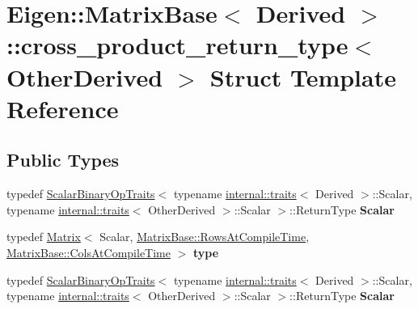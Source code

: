 \hypertarget{struct_eigen_1_1_matrix_base_1_1cross__product__return__type}{}\section{Eigen\+:\+:Matrix\+Base$<$ Derived $>$\+:\+:cross\+\_\+product\+\_\+return\+\_\+type$<$ Other\+Derived $>$ Struct Template Reference}
\label{struct_eigen_1_1_matrix_base_1_1cross__product__return__type}
\subsection*{Public Types}
\begin{DoxyCompactItemize}
\item 
\mbox{\label{struct_eigen_1_1_matrix_base_1_1cross__product__return__type_a6e0581468e4f9491c64d92d748b6f3f9}} 
typedef \hyperlink{group___core___module_struct_eigen_1_1_scalar_binary_op_traits}{Scalar\+Binary\+Op\+Traits}$<$ typename \hyperlink{struct_eigen_1_1internal_1_1traits}{internal\+::traits}$<$ Derived $>$\+::Scalar, typename \hyperlink{struct_eigen_1_1internal_1_1traits}{internal\+::traits}$<$ Other\+Derived $>$\+::Scalar $>$\+::Return\+Type {\bfseries Scalar}
\item 
\mbox{\label{struct_eigen_1_1_matrix_base_1_1cross__product__return__type_ad0d0f7a06c69ccea87a0ec5c397d8ec5}} 
typedef \hyperlink{group___core___module_class_eigen_1_1_matrix}{Matrix}$<$ Scalar, \hyperlink{group___core___module_a9784b8701c2d1c79fa8000e1b3ebdb8ba41d81bf4037b4d74c03b1242d8c133c0}{Matrix\+Base\+::\+Rows\+At\+Compile\+Time}, \hyperlink{group___core___module_a9784b8701c2d1c79fa8000e1b3ebdb8bac1b474fd08671c39df677c4acdbc8df0}{Matrix\+Base\+::\+Cols\+At\+Compile\+Time} $>$ {\bfseries type}
\item 
\mbox{\label{struct_eigen_1_1_matrix_base_1_1cross__product__return__type_a6e0581468e4f9491c64d92d748b6f3f9}} 
typedef \hyperlink{group___core___module_struct_eigen_1_1_scalar_binary_op_traits}{Scalar\+Binary\+Op\+Traits}$<$ typename \hyperlink{struct_eigen_1_1internal_1_1traits}{internal\+::traits}$<$ Derived $>$\+::Scalar, typename \hyperlink{struct_eigen_1_1internal_1_1traits}{internal\+::traits}$<$ Other\+Derived $>$\+::Scalar $>$\+::Return\+Type {\bfseries Scalar}

\end{DoxyCompactItemize}

